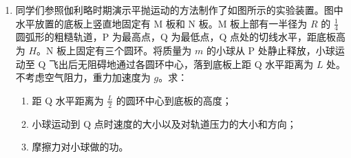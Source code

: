 \documentclass[\gkver]{gaokaozhenti}
\begin{document}
\begin{enumerate}
\begin{enumerate}
	\item
	求此时线圈所受安培力的大小和方向。

	\item
	若此时线圈水平向右运动的速度大小为 $v$，求安培力的功率。
\end{enumerate}



\item
同学们参照伽利略时期演示平抛运动的方法制作了如图所示的实验装置。图中水平放置的底板上竖直地固定有 M 板和 N 板。M 板上部有一半径为 $R$ 的 $\frac{1}{4}$ 圆弧形的粗糙轨道，P 为最高点，Q 为最低点，Q 点处的切线水平，距底板高为 $H$。N 板上固定有三个圆环。将质量为 $m$ 的小球从 P 处静止释放，小球运动至 Q 飞出后无阻碍地通过各圆环中心，落到底板上距 Q 水平距离为 $L$ 处。不考虑空气阻力，重力加速度为 $g$。求：

\begin{enumerate}
	\item
	距 Q 水平距离为 $\frac{L}{2}$ 的圆环中心到底板的高度；

	\item
	小球运动到 Q 点时速度的大小以及对轨道压力的大小和方向；

	\item
	摩擦力对小球做的功。
\end{enumerate}




\end{enumerate}
\end{document}
